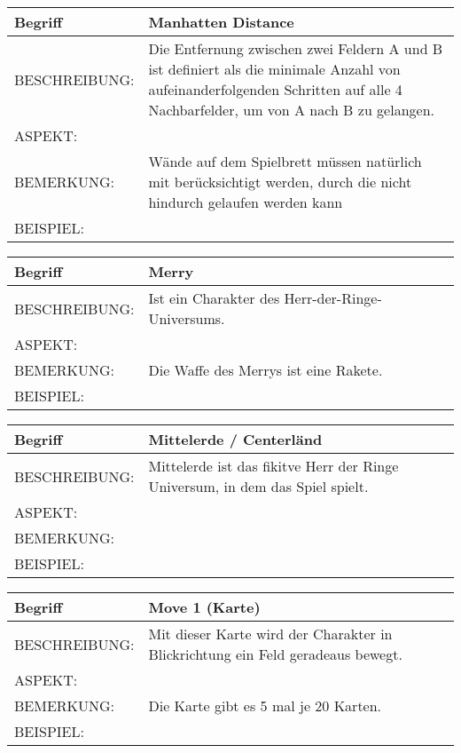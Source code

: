 \documentclass{uulm-assignment}
\begin{document}
	     \begin{tabularx}{\textwidth}{|l|X |} \hline
	        \textbf{Begriff} & \textbf{Manhatten Distance } \\
	        \hline
	        BESCHREIBUNG: & Die Entfernung zwischen zwei Feldern A und B ist definiert als die minimale Anzahl von aufeinanderfolgenden Schritten auf alle 4 Nachbarfelder, um von A nach B zu gelangen. \\
	        \hline
	        ASPEKT: &
	        \\
	        \hline
	        BEMERKUNG: & Wände auf dem Spielbrett müssen natürlich mit berücksichtigt werden, durch die nicht hindurch gelaufen werden kann\\
	        \hline
	        BEISPIEL: & \\
	        \hline
	    \end{tabularx}

	     \begin{tabularx}{\textwidth}{|l|X |} \hline
	        \textbf{Begriff} & \textbf{Merry } \\
	        \hline
	        BESCHREIBUNG: & Ist ein Charakter des Herr-der-Ringe-Universums. \\
	        \hline
	        ASPEKT: &
	        \\
	        \hline
	        BEMERKUNG: & Die Waffe des Merrys ist eine Rakete. \\
	        \hline
	        BEISPIEL: & \\
	        \hline
	    \end{tabularx}

	     \begin{tabularx}{\textwidth}{|l|X |} \hline
	        \textbf{Begriff} & \textbf{Mittelerde / Centerländ} \\
	        \hline
	        BESCHREIBUNG: & Mittelerde ist das fikitve Herr der Ringe Universum, in dem das Spiel spielt. \\
	        \hline
	        ASPEKT: &
	        \\
	        \hline
	        BEMERKUNG: & \\
	        \hline
	        BEISPIEL: & \\
	        \hline
	    \end{tabularx}

	     \begin{tabularx}{\textwidth}{|l|X |} \hline
	        \textbf{Begriff} & \textbf{Move 1 (Karte)} \\
	        \hline
	        BESCHREIBUNG: & Mit dieser Karte wird der Charakter in Blickrichtung ein Feld geradeaus bewegt. \\
	        \hline
	        ASPEKT: &
	        \\
	        \hline
	        BEMERKUNG: & Die Karte gibt es 5 mal je 20 Karten. \\
	        \hline
	        BEISPIEL: & \\
	        \hline
	    \end{tabularx}
\end{document}
